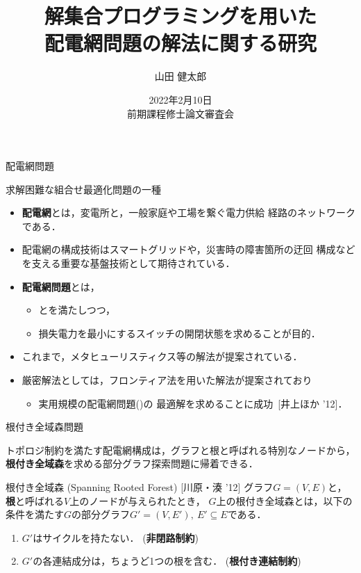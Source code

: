 \documentclass[dvipdfmx,11pt]{beamer}
\title{解集合プログラミングを用いた\\配電網問題の解法に関する研究}
\author[山田 健太郎]{山田 健太郎}
\date{2022年2月10日\\前期課程修士論文審査会}
\institute{番原研究室}
\begin{document}
\begin{frame}{}
  \titlepage
\end{frame}

\begin{frame}{配電網問題}
  \begin{alertblock}{}\centering
    求解困難な組合せ最適化問題の一種
  \end{alertblock}
  \vfill
  \begin{itemize}
  \item \alert{\bf 配電網}とは，変電所と，一般家庭や工場を繋ぐ電力供給
    経路のネットワークである．
  \item  配電網の構成技術はスマートグリッドや，災害時の障害箇所の迂回
    構成などを支える重要な基盤技術として期待されている．
  \item \alert{\bf 配電網問題}とは，
    \begin{itemize}
    \item {}とを満たしつつ，
    \item 損失電力を最小にするスイッチの開閉状態を求めることが目的．
    \end{itemize}
  \item これまで，メタヒューリスティクス等の解法が提案されている．
  \item 厳密解法としては，フロンティア法を用いた解法が提案されており
    \begin{itemize}
    \item 実用規模の配電網問題()の
      最適解を求めることに成功~[井上ほか '12]．
    \end{itemize}
  \end{itemize}
\end{frame}
\begin{frame}{根付き全域森問題}
 \begin{alertblock}{}
  トポロジ制約を満たす配電網構成は，グラフと根と呼ばれる特別なノードから，
  \alert{\bf 根付き全域森}を求める部分グラフ探索問題に帰着できる．
 \end{alertblock}
 \vfill
 \begin{block}{根付き全域森 (Spanning Rooted Forest) [川原・湊 '12]}
  グラフ$G=(V,E)$と，
  \textbf{根}と呼ばれる$V$上のノードが与えられたとき，
  $G$上の根付き全域森とは，以下の条件を満たす$G$の部分グラフ$G'=(V,E'),\ E' \subseteq E$である．
  \begin{enumerate}
   \item $G'$はサイクルを持たない． (\alert{\bf 非閉路制約})
   \item $G'$の各連結成分は，ちょうど1つの根を含む． (\alert{\bf 根付き連結制約})
  \end{enumerate}
 \end{block}
\end{frame}
\end{document}
